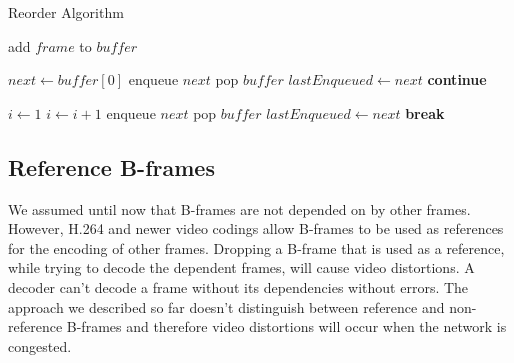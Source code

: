 \begin{algorithm}
\caption{Reorder Algorithm}\label{alg:reorder}
\begin{algorithmic}
        \State \Return {}
    \EndIf
    \item[]
    \State add $frame$ to $buffer$
    \item[]
        \State $next \gets buffer[0]$
            \State enqueue $next$
            \State pop $buffer$
            \State $lastEnqueued \gets next$
            \State \textbf{continue}
        \EndIf
        \item[]
        \State $i \gets 1$ 
            \State $i \gets i + 1$
        \EndWhile
         
            \State enqueue $next$
            \State pop $buffer$
            \State $lastEnqueued \gets next$
        \Else {}
            \State \textbf{break} 
        \EndIf
    \EndWhile
\EndFunction
\end{algorithmic}
\end{algorithm}

\subsection{Reference B-frames}\label{section:reference_b_frames}
We assumed until now that B-frames are not depended on by other frames. However, H.264 and newer video codings allow B-frames to be used as references for the encoding of other frames. Dropping a B-frame that is used as a reference, while trying to decode the dependent frames, will cause video distortions. A decoder can't decode a frame without its dependencies without errors. The approach we described so far doesn't distinguish between reference and non-reference B-frames and therefore video distortions will occur when the network is congested.

